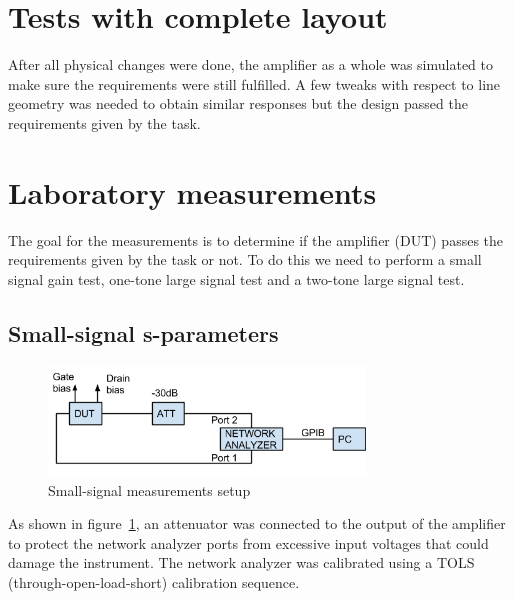   \section{Tests with complete layout}
  After all physical changes were done, the amplifier as a whole was simulated to make sure the requirements were still fulfilled. A few tweaks with respect to line geometry was needed to obtain similar responses but the design passed the requirements given by the task.
  
  \section{Laboratory measurements}
  The goal for the measurements is to determine if the amplifier (DUT) passes the requirements given by the task or not. To do this we need to perform a small signal gain test, one-tone large signal test and a two-tone large signal test.
  \subsection{Small-signal s-parameters}
	\begin{figure}[h]
	  \centering
	  \includegraphics[width=0.75\textwidth]{img/Small_signal_meas}
	  \caption{Small-signal measurements setup}
	  \label{fig:fig_small_meas}
    \end{figure}
	As shown in figure~\ref{fig:fig_small_meas}, an attenuator was connected to the output of the amplifier to protect the network analyzer ports from excessive input voltages that could damage the instrument. The network analyzer was calibrated using a TOLS (through-open-load-short) calibration sequence.
  
